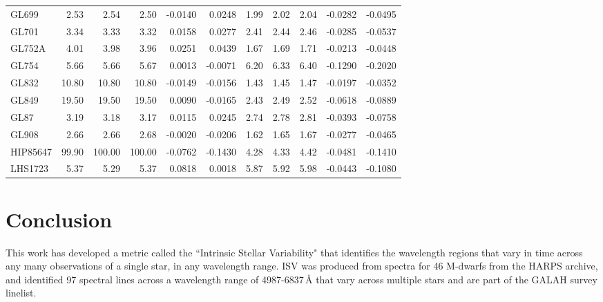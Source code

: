 \begin{longtable}{|l||r|r|r|r|r||r|r|r|r|r|}
GL699 & 2.53 & 2.54 & 2.50 & -0.0140 & 0.0248 & 1.99 & 2.02 & 2.04 & -0.0282 & -0.0495\\    
GL701 & 3.34 & 3.33 & 3.32 & 0.0158 & 0.0277 & 2.41 & 2.44 & 2.46 & -0.0285 & -0.0537\\   
GL752A & 4.01 & 3.98 & 3.96 & 0.0251 & 0.0439 & 1.67 & 1.69 & 1.71 & -0.0213 & -0.0448\\  
GL754 & 5.66 & 5.66 & 5.67 & 0.0013 & -0.0071 & 6.20 & 6.33 & 6.40 & -0.1290 & -0.2020\\    
GL832 & 10.80 & 10.80 & 10.80 & -0.0149 & -0.0156 & 1.43 & 1.45 & 1.47 & -0.0197 & -0.0352\\ 
GL849 & 19.50 & 19.50 & 19.50 & 0.0090 & -0.0165 & 2.43 & 2.49 & 2.52 & -0.0618 & -0.0889\\ 
GL87 & 3.19 & 3.18 & 3.17 & 0.0115 & 0.0245 & 2.74 & 2.78 & 2.81 & -0.0393 & -0.0758\\    
GL908 & 2.66 & 2.66 & 2.68 & -0.0020 & -0.0206 & 1.62 & 1.65 & 1.67 & -0.0277 & -0.0465\\
HIP85647 & 99.90 & 100.00 & 100.00 & -0.0762 & -0.1430 & 4.28 & 4.33 & 4.42 & -0.0481 & -0.1410\\  
LHS1723 & 5.37 & 5.29 & 5.37 & 0.0818 & 0.0018 & 5.87 & 5.92 & 5.98 & -0.0443 & -0.1080\\ 
\end{longtable}

\section{Conclusion}
\label{secISVconclusion}
This work has developed a metric called the ``Intrinsic Stellar Variability" that identifies the wavelength regions that vary in time across any many observations of a single star, in any wavelength range. ISV was produced from spectra for 46 M-dwarfs from the HARPS archive, and identified 97 spectral lines across a wavelength range of 4987-6837\,\hbox{\AA} that vary across multiple stars and are part of the GALAH survey linelist.\\

